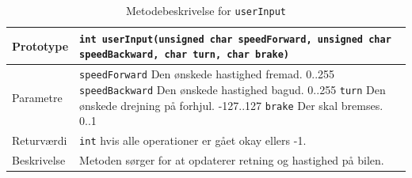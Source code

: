 \begin{table}[H]
\begin{tabularx}{\textwidth}{| L{2.5 cm} | Z |} \hline
Prototype & \texttt{int userInput(unsigned char speedForward, unsigned char speedBackward, 
	char turn, char brake)} \\\hline
Parametre & \texttt{speedForward} \newline Den ønskede hastighed fremad. 0..255\newline
		\texttt{speedBackward} \newline Den ønskede hastighed bagud. 0..255\newline
		\texttt{turn} \newline Den ønskede drejning på forhjul. -127..127\newline
		\texttt{brake} \newline Der skal bremses. 0..1\newline 
 \\\hline
Returværdi &  \texttt{int}  hvis alle operationer er gået okay ellers -1. \\\hline
Beskrivelse & Metoden sørger for at opdaterer retning og hastighed på bilen. \\\hline
\end{tabularx}
\caption{Metodebeskrivelse for \texttt{userInput}}
\label{table:met_getdistance}
\end{table}